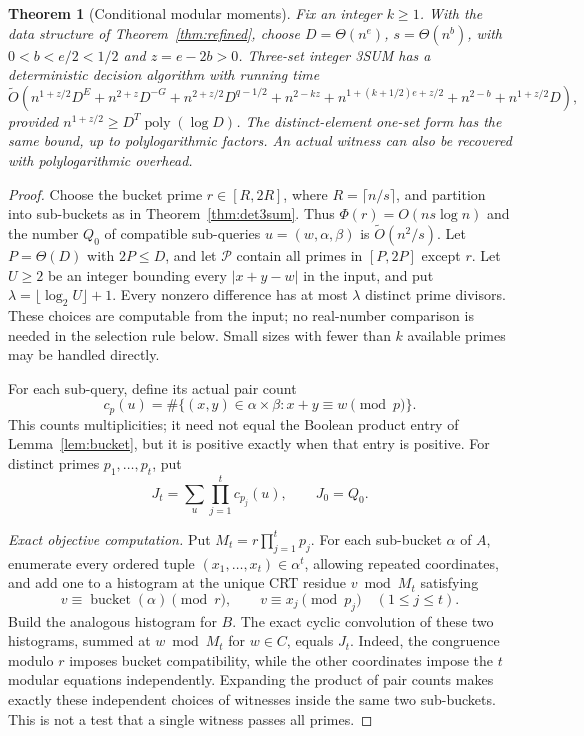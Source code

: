 \documentclass[11pt]{article}
\newtheorem{theorem}{Theorem}
\newcommand{\softO}{\widetilde O}
\begin{document}
\begin{theorem}[Conditional modular moments]
\label{thm:moment3sum}
Fix an integer $k\ge1$. With the data structure of
Theorem~\ref{thm:refined}, choose $D=\Theta(n^e)$,
$s=\Theta(n^b)$, with $0<b<e/2<1/2$ and $z=e-2b>0$. Three-set integer 3SUM has a deterministic
decision algorithm with running time
\[
\softO\left(n^{1+z/2}D^E+n^{2+z}D^{-G}
+n^{2+z/2}D^{q-1/2}+n^{2-kz}
+n^{1+(k+1/2)e+z/2}+n^{2-b}+n^{1+z/2}D\right),
\]
provided $n^{1+z/2}\ge D^T\operatorname{poly}(\log D)$.
The distinct-element one-set form has the same bound, up to
polylogarithmic factors. An actual witness can also be recovered with
polylogarithmic overhead.
\end{theorem}
\begin{proof}
Choose the bucket prime $r\in[R,2R]$, where $R=\lceil n/s\rceil$, and
partition into sub-buckets as in Theorem~\ref{thm:det3sum}. Thus
$\Phi(r)=O(ns\log n)$ and the number $Q_0$ of compatible sub-queries
$u=(w,\alpha,\beta)$ is $\softO(n^2/s)$.
Let $P=\Theta(D)$ with $2P\le D$, and let $\mathcal P$ contain all primes
in $[P,2P]$ except $r$. Let $U\ge2$ be an integer bounding every
$|x+y-w|$ in the input, and put $\lambda=\lfloor\log_2U\rfloor+1$.
Every nonzero difference has at most $\lambda$ distinct prime divisors.
These choices are computable from the input; no real-number comparison is
needed in the selection rule below. Small sizes with fewer than $k$
available primes may be handled directly.

For each sub-query, define its actual pair count
\[
c_p(u)=\#\{(x,y)\in\alpha\times\beta:x+y\equiv w\pmod p\}.
\]
This counts multiplicities; it need not equal the Boolean product entry
of Lemma~\ref{lem:bucket}, but it is positive exactly when that entry is
positive. For distinct primes $p_1,\ldots,p_t$, put
\[
J_t=\sum_u\prod_{j=1}^t c_{p_j}(u),\qquad J_0=Q_0.
\]

\emph{Exact objective computation.} Put $M_t=r\prod_{j=1}^t p_j$.
For each sub-bucket $\alpha$ of $A$, enumerate every ordered tuple
$(x_1,\ldots,x_t)\in\alpha^t$, allowing repeated coordinates, and add one
to a histogram at the unique CRT residue $v\bmod M_t$ satisfying
\[
v\equiv\operatorname{bucket}(\alpha)\pmod r,
\qquad v\equiv x_j\pmod{p_j}\quad(1\le j\le t).
\]
Build the analogous histogram for $B$. The exact cyclic convolution of
these two histograms, summed at $w\bmod M_t$ for $w\in C$, equals $J_t$.
Indeed, the congruence modulo $r$ imposes bucket compatibility, while the
other coordinates impose the $t$ modular equations independently. Expanding
the product of pair counts makes exactly these independent choices of
witnesses inside the same two sub-buckets. This is not a test that a
single witness passes all primes.


\end{proof}
\end{document}

